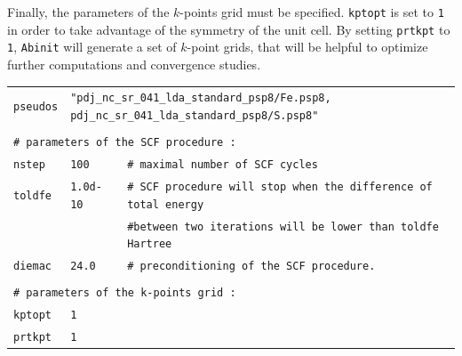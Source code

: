 \documentclass[11pt,a4paper]{article}
\begin{document}
Finally, the parameters of the $k$-points grid must be specified. \texttt{kptopt} is set to \texttt{1} in order to take advantage of the symmetry of the unit cell. 
By setting \texttt{prtkpt} to \texttt{1}, \texttt{Abinit} will generate a set of $k$-point grids, that will be helpful to optimize further computations and convergence studies.
\begin{center}
\begin{tabular}{lll}
\texttt{pseudos} & \multicolumn{2}{l}{\texttt{"pdj\_nc\_sr\_041\_lda\_standard\_psp8/Fe.psp8, pdj\_nc\_sr\_041\_lda\_standard\_psp8/S.psp8"}}\\
&&\\
\multicolumn{3}{l}{\texttt{\# parameters of the SCF procedure : }}\\
\texttt{nstep} & \texttt{100} &\texttt{\# maximal number of SCF cycles}\\
\texttt{toldfe} & \texttt{1.0d-10} &\texttt{\# SCF procedure will stop when the difference of total energy}\\
&&\texttt{\#\space\space\space\space between two iterations will be lower than toldfe Hartree}\\
\texttt{diemac} &\texttt{24.0} & \texttt{\# preconditioning of the SCF procedure.}\\
&&\\
\multicolumn{3}{l}{\texttt{\# parameters of the k-points grid : }}\\
\texttt{kptopt} & \texttt{1} &\\
\texttt{prtkpt} & \texttt{1} 
\end{tabular}
\end{center}
\end{document}
